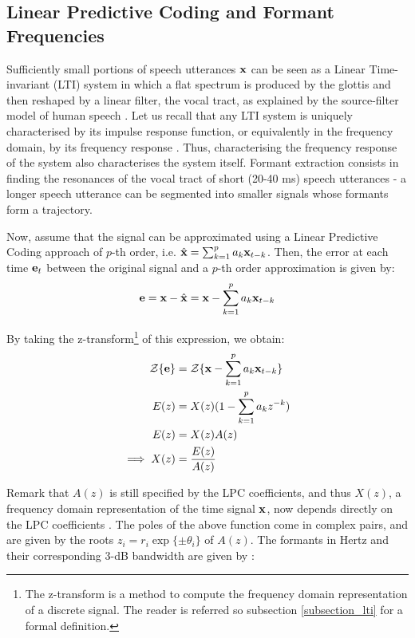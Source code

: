 \documentclass[../main.tex]{subfiles} \label{chapter_soa}
\begin{document}
\subsection{Linear Predictive Coding and Formant Frequencies} \label{subsection_formants}
Sufficiently small portions of speech utterances $\mathbf{x}$ can be seen as a Linear Time-invariant (LTI) system in which a flat spectrum is produced by the glottis and then reshaped by a linear filter, the vocal tract, as explained by the source-filter model of human speech \cite{Bello}. Let us recall that any LTI system is uniquely characterised by its impulse response function, or equivalently in the frequency domain, by its frequency response \cite{markel1976}. Thus, characterising the frequency response of the system also characterises the system itself. Formant extraction consists in finding the resonances of the vocal tract of short (20-40 ms) speech utterances - a longer speech utterance can be segmented into smaller signals whose formants form a trajectory.
\par Now, assume that the signal can be approximated using a Linear Predictive Coding approach of $p$-th order, i.e. $\hat{\mathbf{x}} = \sum_{k=1}^pa_k\mathbf{x}_{t-k}$. Then, the error at each time $\mathbf{e}_t$ between the original signal and a $p$-th order approximation is given by: 
\begin{align*}
\mathbf{e} = \mathbf{x} - \hat{\mathbf{x}} = \mathbf{x} - \sum_{k=1}^p{a_k \mathbf{x}_{t-k}}
\end{align*} 
\par By taking the z-transform\footnote{The z-transform is a method to compute the frequency domain representation of a discrete signal. The reader is referred so subsection \ref{subsection_lti} for a formal definition.} of this expression, we obtain:
\begin{align*}
\mathcal{Z}\{\mathbf{e}\} &= \mathcal{Z}\{\mathbf{x} - \sum_{k=1}^p{a_k \mathbf{x}_{t-k}}\}\\
E(z) &= X(z)(1-\sum_{k=1}^p{a_k z^{-k}})\\
E(z) &= X(z)A(z)\\
\implies X(z) &= \frac{E(z)}{A(z)}
\end{align*}
\par Remark that $A(z)$ is still specified by the LPC coefficients, and thus $X(z)$, a frequency domain representation of the time signal $\mathbf{x}$, now depends directly on the LPC coefficients \cite{Hosom2006}. The poles of the above function come in complex pairs, and are given by the roots $z_i = r_i\exp{\{\pm\theta_i\}}$ of $A(z)$. The formants in Hertz and their corresponding 3-dB bandwidth are given by \cite{Snell1993,Mathworks2015}:
\end{document}
